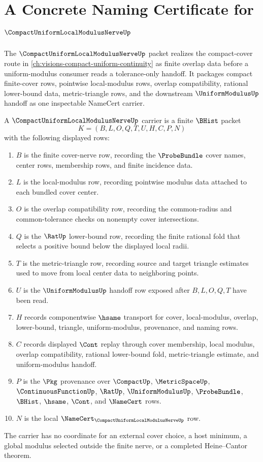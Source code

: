 \chapter{A Concrete Naming Certificate for $\CompactUniformLocalModulusNerveUp$}
\label{ch:concrete-instances-compact-uniform-local-modulus-nerve-namecert}

The $\CompactUniformLocalModulusNerveUp$ packet realizes the compact-cover route in \autoref{ch:visions-compact-uniform-continuity} as finite overlap data before a uniform-modulus consumer reads a tolerance-only handoff. It packages compact finite-cover rows, pointwise local-modulus rows, overlap compatibility, rational lower-bound data, metric-triangle rows, and the downstream $\UniformModulusUp$ handoff as one inspectable NameCert carrier.

\begin{definition}
\label{def:compact-uniform-local-modulus-nerve-carrier}
A $\CompactUniformLocalModulusNerveUp$ carrier is a finite $\BHist$ packet
$$
K=(B,L,O,Q,T,U,H,C,P,N)
$$
with the following displayed rows:
\begin{enumerate}
\item $B$ is the finite cover-nerve row, recording the $\ProbeBundle$ cover names, center rows, membership rows, and finite incidence data.
\item $L$ is the local-modulus row, recording pointwise modulus data attached to each bundled cover center.
\item $O$ is the overlap compatibility row, recording the common-radius and common-tolerance checks on nonempty cover intersections.
\item $Q$ is the $\RatUp$ lower-bound row, recording the finite rational fold that selects a positive bound below the displayed local radii.
\item $T$ is the metric-triangle row, recording source and target triangle estimates used to move from local center data to neighboring points.
\item $U$ is the $\UniformModulusUp$ handoff row exposed after $B,L,O,Q,T$ have been read.
\item $H$ records componentwise $\hsame$ transport for cover, local-modulus, overlap, lower-bound, triangle, uniform-modulus, provenance, and naming rows.
\item $C$ records displayed $\Cont$ replay through cover membership, local modulus, overlap compatibility, rational lower-bound fold, metric-triangle estimate, and uniform-modulus handoff.
\item $P$ is the $\Pkg$ provenance over $\CompactUp$, $\MetricSpaceUp$, $\ContinuousFunctionUp$, $\RatUp$, $\UniformModulusUp$, $\ProbeBundle$, $\BHist$, $\hsame$, $\Cont$, and $\NameCert$ rows.
\item $N$ is the local $\NameCert_{\CompactUniformLocalModulusNerveUp}$ row.
\end{enumerate}
The carrier has no coordinate for an external cover choice, a host minimum, a global modulus selected outside the finite nerve, or a completed Heine--Cantor theorem.
\end{definition}

